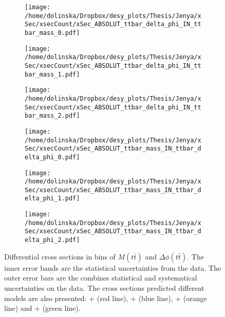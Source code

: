 \begin{sidewaysfigure}[p]
\centering
\begin{subfigure}
  \centering
  \texttt{[image: /home/dolinska/Dropbox/desy\_plots/Thesis/Jenya/xSec/xsecCount/xSec\_ABSOLUT\_ttbar\_delta\_phi\_IN\_ttbar\_mass\_0.pdf]}
\end{subfigure}
\begin{subfigure}
  \centering
  \texttt{[image: /home/dolinska/Dropbox/desy\_plots/Thesis/Jenya/xSec/xsecCount/xSec\_ABSOLUT\_ttbar\_delta\_phi\_IN\_ttbar\_mass\_1.pdf]}
\end{subfigure}
\begin{subfigure}
  \centering
  \texttt{[image: /home/dolinska/Dropbox/desy\_plots/Thesis/Jenya/xSec/xsecCount/xSec\_ABSOLUT\_ttbar\_delta\_phi\_IN\_ttbar\_mass\_2.pdf]}
\end{subfigure}
\begin{subfigure}
  \centering
  \texttt{[image: /home/dolinska/Dropbox/desy\_plots/Thesis/Jenya/xSec/xsecCount/xSec\_ABSOLUT\_ttbar\_mass\_IN\_ttbar\_delta\_phi\_0.pdf]}
\end{subfigure}
\begin{subfigure}
  \centering
  \texttt{[image: /home/dolinska/Dropbox/desy\_plots/Thesis/Jenya/xSec/xsecCount/xSec\_ABSOLUT\_ttbar\_mass\_IN\_ttbar\_delta\_phi\_1.pdf]}
\end{subfigure}
\begin{subfigure}
  \centering
  \texttt{[image: /home/dolinska/Dropbox/desy\_plots/Thesis/Jenya/xSec/xsecCount/xSec\_ABSOLUT\_ttbar\_mass\_IN\_ttbar\_delta\_phi\_2.pdf]}
\end{subfigure}
\caption{Differential cross sections in bins of $M(t\bar{t})$ and $\Delta\phi(t\bar{t})$. The inner error bands are the statistical uncertainties from the data.
         The outer error bars are the combines statistical and systematical uncertainties on the data. The cross sections predicted different models are also presented:
         \MG + \PYTHIA (red line), \Powheg + \PYTHIA (blue line), \Powheg + \HERWIG (orange line) and \MCNLO + \HERWIG (green line).}
\label{fig:XSU_2D_phi_Mtt}
\end{sidewaysfigure}

